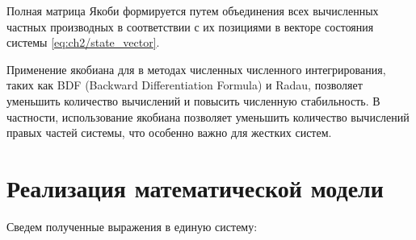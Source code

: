 Полная матрица Якоби формируется путем объединения всех вычисленных частных производных в
соответствии с их позициями в векторе состояния системы \eqref{eq:ch2/state_vector}.

Применение якобиана для в методах численных численного интегрирования, таких как
BDF (Backward Differentiation Formula) и Radau, позволяет уменьшить количество вычислений
и повысить численную стабильность. В частности, использование якобиана позволяет
уменьшить количество вычислений правых частей системы, что особенно важно для жестких систем.

\section{Реализация математической модели}\label{sec:ch2/sec6}

Сведем полученные выражения в единую систему:

